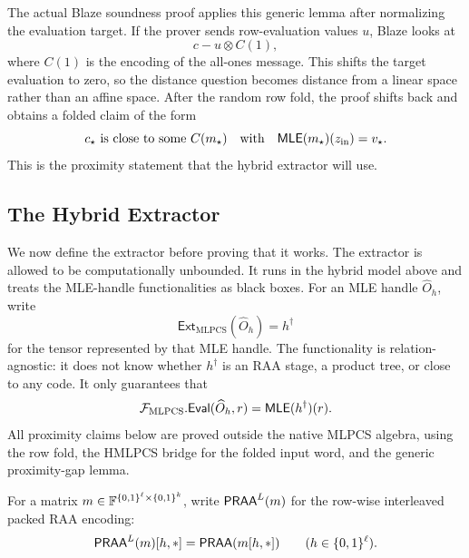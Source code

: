 The actual Blaze soundness proof applies this generic lemma after normalizing
the evaluation target.  If the prover sends row-evaluation values \(u\), Blaze
looks at
\[
  c-u\otimes C(1),
\]
where \(C(1)\) is the encoding of the all-ones message.  This shifts the target
evaluation to zero, so the distance question becomes distance from a linear
space rather than an affine space.  After the random row fold, the proof shifts
back and obtains a folded claim of the form
\[
  c_\star \text{ is close to some } C(m_\star)
  \quad\text{with}\quad
  \mathsf{MLE}(m_\star)(z_{\mathrm{in}})=v_\star.
\]
This is the proximity statement that the hybrid extractor will use.

\subsection{The Hybrid Extractor}

We now define the extractor before proving that it works.  The extractor is
allowed to be computationally unbounded.  It runs in the hybrid model above and
treats the MLE-handle functionalities as black boxes.  For an MLE handle
\(\widehat O_h\), write
\[
  \mathsf{Ext}_{\mathrm{MLPCS}}(\widehat O_h)=h^\dagger
\]
for the tensor represented by that MLE handle.  The functionality is
relation-agnostic: it does not know whether \(h^\dagger\) is an RAA stage, a
product tree, or close to any code.  It only guarantees that
\[
  \mathcal F_{\mathrm{MLPCS}}.\mathsf{Eval}(\widehat O_h,r)
  =
  \mathsf{MLE}(h^\dagger)(r).
\]
All proximity claims below are proved outside the native MLPCS algebra, using
the row fold, the HMLPCS bridge for the folded input word, and the generic
proximity-gap lemma.

For a matrix \(m\in\mathbb{F}^{\{0,1\}^\ell\times\{0,1\}^k}\), write \(\mathsf{PRAA}^L(m)\) for the
row-wise interleaved packed RAA encoding:
\[
  \mathsf{PRAA}^L(m)[h,\ast]=\mathsf{PRAA}(m[h,\ast])
  \qquad(h\in\{0,1\}^\ell).
\]

